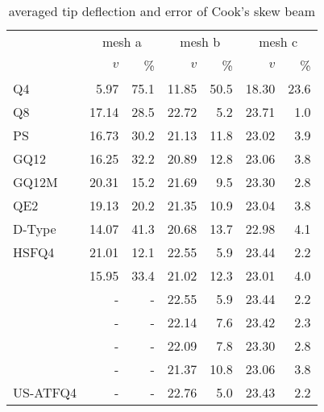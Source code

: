 \documentclass[3p,sort&compress,review,11pt]{elsarticle}
\begin{document}
\begin{table}[htb]
\centering\scriptsize
\caption{averaged tip deflection and error of Cook's skew beam}\label{table:cooks}
\begin{tabular}{lrrrrrr}
	\toprule
	                       & \multicolumn{2}{c}{mesh a} & \multicolumn{2}{c}{mesh b} & \multicolumn{2}{c}{mesh c} \\
	                       &   $v$ &      \si{\percent} &   $v$ &      \si{\percent} &   $v$ &      \si{\percent} \\ \midrule
	Q4                     &  5.97 &               75.1 & 11.85 &               50.5 & 18.30 &               23.6 \\
	Q8                     & 17.14 &               28.5 & 22.72 &                5.2 & 23.71 &                1.0 \\
	PS                     & 16.73 &               30.2 & 21.13 &               11.8 & 23.02 &                3.9 \\
	GQ12                   & 16.25 &               32.2 & 20.89 &               12.8 & 23.06 &                3.8 \\
	GQ12M                  & 20.31 &               15.2 & 21.69 &                9.5 & 23.30 &                2.8 \\
	QE2                    & 19.13 &               20.2 & 21.35 &               10.9 & 23.04 &                3.8 \\
	D-Type                 & 14.07 &               41.3 & 20.68 &               13.7 & 22.98 &                4.1 \\
	HSFQ4                  & 21.01 &               12.1 & 22.55 &                5.9 & 23.44 &                2.2 \\
	\citet{Pimpinelli2004} & 15.95 &               33.4 & 21.02 &               12.3 & 23.01 &                4.0 \\
	\citet{Choi2006}       &     - &                  - & 22.55 &                5.9 & 23.44 &                2.2 \\
	\citet{Madeo2012}      &     - &                  - & 22.14 &                7.6 & 23.42 &                2.3 \\
	\citet{Boutagouga2016} &     - &                  - & 22.09 &                7.8 & 23.30 &                2.8 \\
	\citet{Zouari2016}     &     - &                  - & 21.37 &               10.8 & 23.06 &                3.8 \\
	US-ATFQ4               &     - &                  - & 22.76 &                5.0 & 23.43 &                2.2 \\

\end{tabular}
\end{table}
\end{document}
